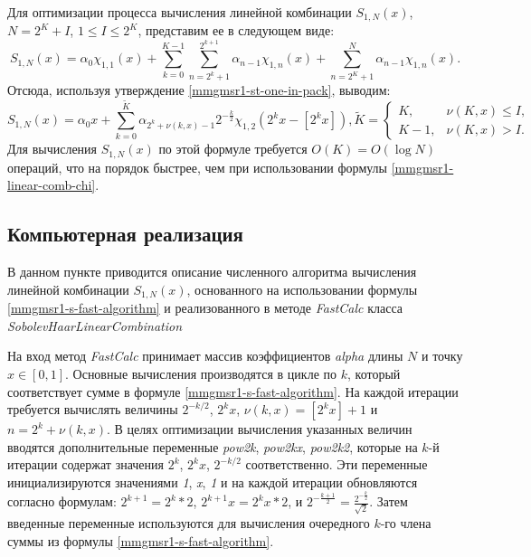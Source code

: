 Для оптимизации процесса вычисления линейной комбинации $S_{1,N}(x)$, $N=2^K+I$, $1 \le I \le 2^K$, представим ее в следующем виде:
\begin{equation*}
S_{1,N}(x)=\alpha_0\chi_{1,1}(x) +
\sum\limits_{k=0}^{K-1}
\sum\limits_{n=2^k+1}^{2^{k+1}}\alpha_{n-1}\chi_{1,n}(x)+
\sum\limits_{n=2^K+1}^{N}\alpha_{n-1}\chi_{1,n}(x).
\end{equation*}
Отсюда, используя утверждение \eqref{mmgmsr1-st-one-in-pack}, выводим:
\begin{equation}\label{mmgmsr1-s-fast-algorithm}
S_{1,N}(x)=
\alpha_0x+
\sum\limits_{k=0}^{\tilde{K}}\alpha_{2^k+\nu(k,x)-1}2^{-\frac{k}{2}}\chi_{1,2}(2^kx-[2^kx]),
\tilde{K}=
\begin{cases}
K, &\nu(K,x) \le I,\\
K-1, &\nu(K,x) > I.
\end{cases}
\end{equation}
Для вычисления $S_{1,N}(x)$ по этой формуле требуется $O(K)=O(\log N)$ операций, что на порядок быстрее, чем при использовании формулы \eqref{mmgmsr1-linear-comb-chi}.

\subsection{Компьютерная реализация}
%
%
В данном пункте приводится описание численного алгоритма вычисления линейной комбинации $S_{1,N}(x)$,
основанного на использовании формулы \eqref{mmgmsr1-s-fast-algorithm} и реализованного в методе \textit{FastCalc} класса \textit{SobolevHaarLinearCombination} %

На вход метод \textit{FastCalc} принимает массив коэффициентов \textit{alpha} длины $N$ и точку $x \in [0,1]$.
Основные вычисления производятся в цикле по $k$, который соответствует сумме в формуле \eqref{mmgmsr1-s-fast-algorithm}. На каждой итерации требуется вычислять величины $2^{-k/2}$, $2^kx$,  $\nu(k, x) = [2^kx] + 1$ и $n = 2^k + \nu(k, x)$. В целях оптимизации вычисления указанных величин вводятся дополнительные переменные \textit{pow2k}, \textit{pow2kx}, \textit{pow2k2}, которые на $k$-й итерации содержат значения $2^k$, $2^kx$, $2^{-k/2}$ соответственно. Эти переменные инициализируются значениями \textit{1}, \textit{x}, \textit{1} и на каждой итерации обновляются согласно формулам: $2^{k+1} = 2^k * 2$, $2^{k+1}x = 2^kx * 2$, и $2^{-\frac{k+1}{2}} = \frac{2^{-\frac{k}{2}}}{\sqrt{2}}$. Затем введенные переменные используются для вычисления очередного $k$-го члена суммы из формулы \eqref{mmgmsr1-s-fast-algorithm}.

